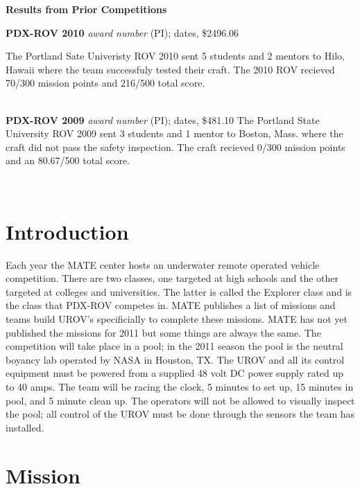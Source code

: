 \documentclass{proposalnsf}
\begin{document}
\newpage


\renewcommand{\thepage} {D--\arabic{page}}

\newpage

\centerline{\bf Results from Prior Competitions}

\noindent
{\bf PDX-ROV 2010}
{\it award number} (PI); dates, \$2496.06

The Portland Sate Univeristy ROV 2010 sent 5 students and 2 mentors to Hilo, Hawaii where the team successfuly tested their craft. The 2010 ROV
recieved 70/300 mission points and 216/500 total score.

\ \\
\noindent
{\bf PDX-ROV 2009}
{\it award number} (PI); dates, \$481.10
The Portland State University ROV 2009 sent 3 students and 1 mentor to Boston, Mass. where the craft did not pass the safety inspection.
The craft recieved 0/300 mission points and an 80.67/500 total score. 


\ \\

\section{Introduction}

Each year the MATE center hosts an underwater remote operated vehicle competition. There are two classes, one targeted at high schools and 
the other targeted at colleges and universities. The latter is called the Explorer class and is the class that PDX-ROV competes in. MATE 
publishes a list of missions and teams build UROV's specificially to complete these missions. MATE has not yet published the missions for 2011
 but some things are always the same. The competition will take place in a pool; in the 2011 season the pool is the neutral boyancy lab
operated by NASA in Houston, TX. The UROV and all its control equipment must be powered from a supplied 48 volt DC power supply rated 
up to 40 amps. The team will be racing the clock, 5 minutes to set up, 15 minutes in pool, and 5 minute clean up. The operators will not 
be allowed to visually inspect the pool; all control of the UROV must be done through the sensors the team has installed. 

\section{Mission}
\end{document}
